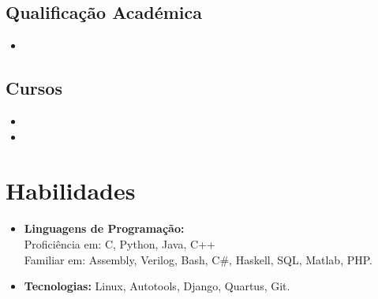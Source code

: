 \documentclass[11pt,a4paper,sans]{moderncv}        %
\begin{document}
\vspace{5pt}

\subsection{Qualificação Académica}

\vspace{5pt}

\begin{itemize}

\item{}

\end{itemize}

\vspace{2pt}

\subsection{Cursos}

\vspace{5pt}

\begin{itemize}

\item{}

\vspace{3pt}

\item{}

\end{itemize}

\section{Habilidades}

\vspace{6pt}

\begin{itemize}

\item \textbf{Linguagens de Programação:} \\ Proficiência em: C, Python, Java, C++ \\ Familiar em: Assembly, Verilog, Bash, C\#, Haskell, SQL, Matlab, PHP.

\vspace{6pt}

\item \textbf{Tecnologias:} Linux, Autotools, Django, Quartus, Git.

\vspace{6pt}

\end{itemize}
\end{document}
